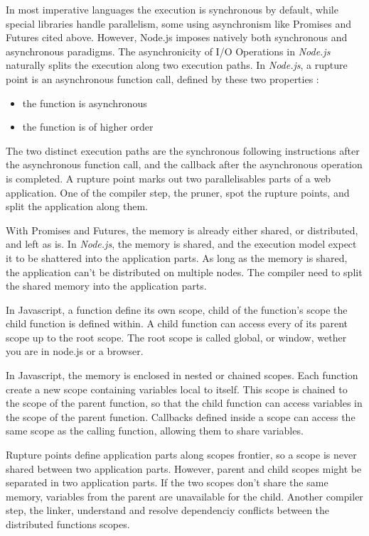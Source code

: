 In most imperative languages the execution is synchronous by default, while special libraries handle parallelism, some using asynchronism like Promises and Futures cited above.
However, Node.js imposes natively both synchronous and asynchronous paradigms.
The asynchronicity of I/O Operations in \textit{Node.js} naturally splits the execution along two execution paths.
In \textit{Node.js}, a rupture point is an asynchronous function call, defined by these two properties :
\begin{itemize}
 \item the function is asynchronous
 \item the function is of higher order
\end{itemize}

The two distinct execution paths are the synchronous following instructions after the asynchronous function call, and the callback after the asynchronous operation is completed.
A rupture point marks out two parallelisables parts of a web application.
One of the compiler step, the pruner, spot the rupture points, and split the application along them.

With Promises and Futures, the memory is already either shared, or distributed, and left as is.
In \textit{Node.js}, the memory is shared, and the execution model expect it to be shattered into the application parts.
As long as the memory is shared, the application can't be distributed on multiple nodes.
The compiler need to split the shared memory into the application parts.

In Javascript, a function define its own scope, child of the function's scope the child function is defined within.
A child function can access every of its parent scope up to the root scope.
The root scope is called global, or window, wether you are in node.js or a browser.

In Javascript, the memory is enclosed in nested or chained scopes.
Each function create a new scope containing variables local to itself.
This scope is chained to the scope of the parent function, so that the child function can access variables in the scope of the parent function.
Callbacks defined inside a scope can access the same scope as the calling function, allowing them to share variables.

Rupture points define application parts along scopes frontier, so a scope is never shared between two application parts.
However, parent and child scopes might be separated in two application parts.
If the two scopes don't share the same memory, variables from the parent are unavailable for the child.
Another compiler step, the linker, understand and resolve dependenciy conflicts between the distributed functions scopes.

